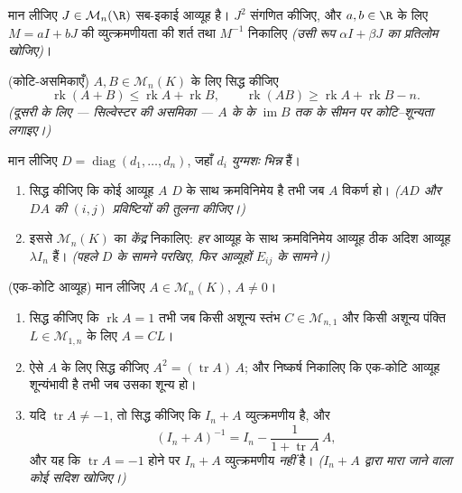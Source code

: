 \begin{exercise}[$\star\star\star$]\label{exo:b1:matrices:9}
मान लीजिए $J \in \mathcal{M}_n(\R)$ सब-इकाई आव्यूह है। $J^2$ संगणित कीजिए,
और $a, b \in \R$ के लिए $M = aI + bJ$ की व्युत्क्रमणीयता की शर्त तथा
$M^{-1}$ निकालिए \emph{(उसी रूप $\alpha I + \beta J$ का प्रतिलोम खोजिए)}।
\end{exercise}

\begin{exercise}[$\star\star\star$]\label{exo:b1:matrices:10}
(कोटि-असमिकाएँ) $A, B \in \mathcal{M}_n(K)$ के लिए सिद्ध कीजिए
\[
\operatorname{rk}(A + B) \leq \operatorname{rk} A +
\operatorname{rk} B,
\qquad
\operatorname{rk}(AB) \geq \operatorname{rk} A + \operatorname{rk}
B - n .
\]
\emph{(दूसरी के लिए --- सिल्वेस्टर की असमिका --- $A$ के  के
$\operatorname{im} B$ तक के सीमन पर कोटि--शून्यता लगाइए।)}
\end{exercise}

\begin{exercise}[$\star\star$]\label{exo:b1:matrices:11}
मान लीजिए $D = \operatorname{diag}(d_1, \dots, d_n)$, जहाँ $d_i$
\emph{युग्मशः भिन्न} हैं।
\begin{enumerate}
  \item सिद्ध कीजिए कि कोई आव्यूह $A$ $D$ के साथ क्रमविनिमेय है तभी जब $A$
  विकर्ण हो। \emph{($AD$ और $DA$ की $(i,j)$ प्रविष्टियों की तुलना कीजिए।)}
  \item इससे $\mathcal{M}_n(K)$ का \emph{केंद्र} निकालिए: \emph{हर} आव्यूह
  के साथ क्रमविनिमेय आव्यूह ठीक अदिश आव्यूह $\lambda I_n$ हैं। \emph{(पहले
  $D$ के सामने परखिए, फिर आव्यूहों $E_{ij}$ के सामने।)}
\end{enumerate}
\end{exercise}

\begin{exercise}[$\star\star\star$]\label{exo:b1:matrices:12}
(एक-कोटि आव्यूह) मान लीजिए $A \in \mathcal{M}_n(K)$, $A \neq 0$।
\begin{enumerate}
  \item सिद्ध कीजिए कि $\operatorname{rk} A = 1$ तभी जब किसी अशून्य स्तंभ $C
  \in \mathcal{M}_{n,1}$ और किसी अशून्य पंक्ति $L \in \mathcal{M}_{1,n}$ के
  लिए $A = CL$।
  \item ऐसे $A$ के लिए सिद्ध कीजिए $A^2 = (\operatorname{tr} A)\,A$; और
  निष्कर्ष निकालिए कि एक-कोटि आव्यूह शून्यंभावी है तभी जब उसका  शून्य
  हो।
  \item यदि $\operatorname{tr} A \neq -1$, तो सिद्ध कीजिए कि $I_n + A$
  व्युत्क्रमणीय है, और
        \[
        (I_n + A)^{-1} = I_n - \frac{1}{1 + \operatorname{tr}
        A}\,A ,
        \]
        और यह कि $\operatorname{tr} A = -1$ होने पर $I_n + A$ व्युत्क्रमणीय
        \emph{नहीं} है। \emph{($I_n + A$ द्वारा मारा जाने वाला कोई सदिश
        खोजिए।)}
\end{enumerate}
\end{exercise}

